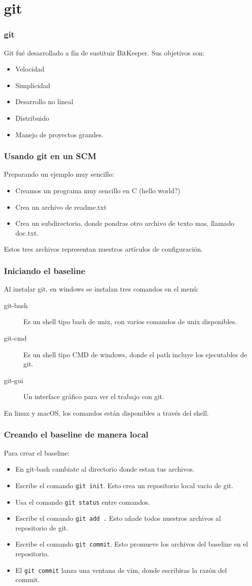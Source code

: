 \section{git}
\begin{frame}
	\frametitle{git}
	Git fu\'e desarrollado a f\'in de sustituir BitKeeper.
	Sus objetivos son:
	\begin{itemize}
		\item Velocidad
		\item Simplicidad
		\item Desarrollo no lineal
		\item Distribuido
		\item Manejo de proyectos grandes.
	\end{itemize}
\end{frame}
\begin{frame}
	\frametitle{Usando git en un SCM}
	Preparando un ejemplo muy sencillo: 
	\begin{itemize}
		\item Creamos un programa muy sencillo en C (hello world?)
		\item Crea un archivo de readme.txt 
		\item Crea un subdirectorio, donde pondras otro archivo de texto mas, llamado doc.txt. 
	\end{itemize}
	Estos tres archivos representan nuestros art\'iculos de configuraci\'on. 
\end{frame}
\begin{frame}
	\frametitle{Iniciando el baseline}
	Al instalar git, en windows se instalan tres comandos en el men\'u:
	\begin{description}
		\item [git-bash] Es un shell tipo bash de unix, con varios comandos de unix disponibles. 
		\item [git-cmd] Es un shell tipo CMD de windows, donde el path incluye los ejecutables de git. 
		\item [git-gui] Un interface gr\'afico para ver el trabajo con git. 
	\end{description}
	En linux y macOS, los comandos est\'an disponibles a trav\'es del shell. 
\end{frame}
\begin{frame}
	\frametitle{Creando el baseline de manera local}
	Para crear el baseline:
	\begin{itemize}
		\item En git-bash cambiate al directorio donde estan tus archivos. 
		\item Escribe el comando \texttt{git init}. Esto crea un repositorio local vacio de git.
		\item Usa el comando \texttt{git status} entre comandos. 
		\item Escribe el comando \texttt{git add .} Esto a\~nade todos nuestros archivos al repositorio de git.
		\item Escribe el comando \texttt{git commit}. Esto promueve los archivos del baseline en el repositorio. 
		\item El \texttt{git commit} lanza una ventana de vim, donde escribiras la raz\'on del commit.  
	\end{itemize}
\end{frame}
